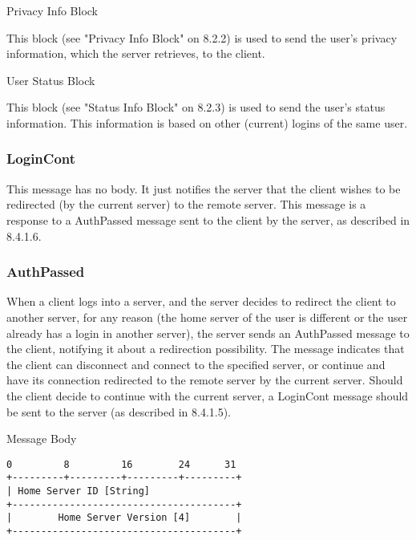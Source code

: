 \documentclass[titlepage,oneside]{book}
\begin{document}
\par{} Privacy Info Block

\subpar{}  This block (see "Privacy Info Block" on 8.2.2) is used to
  send the user's privacy information, which the server retrieves, to
  the client.

\par{} User Status Block

\subpar{}  This block (see "Status Info Block" on 8.2.3) is used to
  send the user's status information. This information is based on
  other (current) logins of the same user.

\subsubsection{LoginCont}

\par{} This message has no body. It just notifies the server that the client
wishes to be redirected (by the current server) to the remote server.
This message is a response to a AuthPassed message sent to the client
by the server, as described in 8.4.1.6.

\subsubsection{AuthPassed}

\par{} When a client logs into a server, and the server decides to redirect
the client to another server, for any reason (the home server of the
user is different or the user already has a login in another server),
the server sends an AuthPassed message to the client, notifying it
about a redirection possibility. The message indicates that the client
can disconnect and connect to the specified server, or continue and
have its connection redirected to the remote server by the current
server. Should the client decide to continue with the current server, a
LoginCont message should be sent to the server (as described in
8.4.1.5).

\par{} Message Body

\begin{verbatim}
0         8         16        24      31
+---------+---------+---------+---------+
| Home Server ID [String]
+---------------------------------------+
|        Home Server Version [4]        |
+---------------------------------------+
\end{verbatim}
\end{document}
